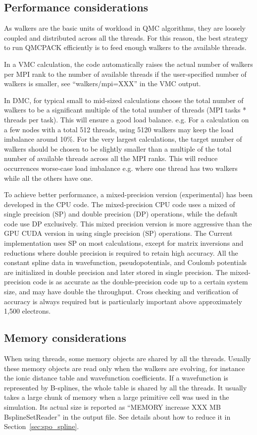 \subsection{Performance considerations}
\label{sec:cpu:performance}
As walkers are the basic units of workload in QMC algorithms, they are loosely coupled and distributed across all the threads. For this reason, the best strategy to run QMCPACK efficiently is to feed enough walkers to the available threads.

In a VMC calculation, the code automatically raises the actual number of walkers per MPI rank to the number of available threads
if the user-specified number of walkers is smaller, see ``walkers/mpi=XXX'' in the VMC output.

In DMC, for typical small to mid-sized calculations choose the total number of walkers to be a significant multiple of the total number of
threads (MPI tasks * threads per task). This will ensure a good load balance. e.g. For a calculation on a few nodes with a total
512 threads, using 5120 walkers may keep the load imbalance around 10\%. For the very largest calculations, the target number of
walkers should be chosen to be slightly smaller than a multiple of the total number of available threads across all the MPI ranks.
This will reduce occurrences worse-case load imbalance e.g. where one thread has two walkers while all the others have one.

To achieve better performance, a mixed-precision version (experimental) has been developed in the CPU code. The mixed-precision
CPU code uses a mixed of single precision (SP) and double precision (DP) operations, while the default code use DP exclusively.
This mixed precision version is more aggressive than the GPU CUDA version in using single precision (SP) operations. The Current implementation uses SP on most
calculations, except for matrix inversions and reductions where double precision is required to retain high accuracy. All the
constant spline data in wavefunction, pseudopotentials, and Coulomb potentials are initialized in double precision and later
stored in single precision. The mixed-precision code is as accurate as the double-precision code up to a certain system size, and
may have double the throughput.
Cross checking and verification of accuracy is always required but is particularly important above approximately 1,500 electrons. 

\subsection{Memory considerations}
When using threads, some memory objects are shared by all the threads. Usually these memory objects are read only when the walkers are evolving, for instance the ionic distance table and wavefunction coefficients.
If a wavefunction is represented by B-splines, the whole table is shared by all the threads. It usually takes a large chunk of memory when a large primitive cell was used in the simulation. Its actual size is reported as ``MEMORY increase XXX MB BsplineSetReader'' in the output file.
See details about how to reduce it in Section~\ref{sec:spo_spline}.

